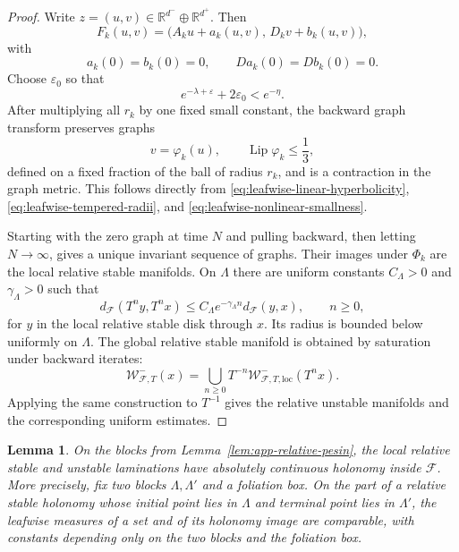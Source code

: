 \documentclass[11pt]{amsart}
\numberwithin{equation}{section}
\theoremstyle{plain}
\newtheorem{lem}[thm]{Lemma}
\begin{document}
\begin{proof}
Write $z=(u,v)\in\mathbb R^{d^-}\oplus\mathbb R^{d^+}$.  Then
\[
 F_k(u,v)
 =\bigl(A_ku+a_k(u,v),\,D_kv+b_k(u,v)\bigr),
\]
with
\[
 a_k(0)=b_k(0)=0,
 \qquad Da_k(0)=Db_k(0)=0.
\]
Choose $\varepsilon_0$ so that
\[
 e^{-\lambda+\varepsilon}+2\varepsilon_0<e^{-\eta}.
\]
After multiplying all $r_k$ by one fixed small constant, the backward graph
transform preserves graphs
\[
 v=\varphi_k(u),
 \qquad \operatorname{Lip}\varphi_k\le\frac13,
\]
defined on a fixed fraction of the ball of radius $r_k$, and is a contraction
in the graph metric.  This follows directly from
\eqref{eq:leafwise-linear-hyperbolicity},
\eqref{eq:leafwise-tempered-radii}, and
\eqref{eq:leafwise-nonlinear-smallness}.

Starting with the zero graph at time $N$ and pulling backward, then letting
$N\to\infty$, gives a unique invariant sequence of graphs.  Their images
under $\Phi_k$ are the local relative stable manifolds.  On $\Lambda$ there
are uniform constants $C_\Lambda>0$ and $\gamma_\Lambda>0$ such that
\begin{equation}\label{eq:leafwise-stable-contraction}
 d_{\mathcal F}(T^ny,T^nx)
 \le C_\Lambda e^{-\gamma_\Lambda n}d_{\mathcal F}(y,x),
 \qquad n\ge0,
\end{equation}
for $y$ in the local relative stable disk through $x$.  Its radius is
bounded below uniformly on $\Lambda$.  The global relative stable manifold
is obtained by saturation under backward iterates:
\[
 \mathcal W^-_{\mathcal F,T}(x)
 =\bigcup_{n\ge0}
 T^{-n}\mathcal W^-_{\mathcal F,T,\mathrm{loc}}(T^nx).
\]
Applying the same construction to $T^{-1}$ gives the relative unstable
manifolds and the corresponding uniform estimates.
\end{proof}

\begin{lem}
\label{lem:app-relative-ac}
On the blocks from Lemma~\ref{lem:app-relative-pesin}, the local relative
stable and unstable laminations have absolutely continuous holonomy inside
$\mathcal F$.  More precisely, fix two blocks $\Lambda,\Lambda'$ and a
foliation box.  On the part of a relative stable holonomy whose initial
point lies in $\Lambda$ and terminal point lies in $\Lambda'$, the
leafwise measures of a set and of its holonomy image are comparable, with
constants depending only on the two blocks and the foliation box.
\end{lem}
\end{document}
